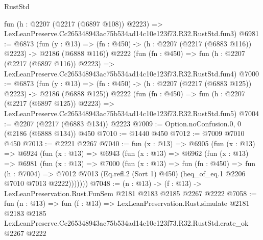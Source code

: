 \begin{lexlean}{RustStd}
\begin{coremodule}
    fun (h : @2207 (@2217 (@6897 @108)) @2223) =>
    LexLeanPreserve.Cc265348943ac75b534ad14c10e123f73.R32.RustStd.fun3)
@6981 := @6873
    (fun (y : @13) => (fn : @450) -> (h : @2207 (@2217 (@6883 @116)) @2223) -> @2186 (@6888 @116))
    @2222
    (fun (fn : @450) =>
    fun (h : @2207 (@2217 (@6897 @116)) @2223) =>
    LexLeanPreserve.Cc265348943ac75b534ad14c10e123f73.R32.RustStd.fun4)
@7000 := @6873
    (fun (y : @13) => (fn : @450) -> (h : @2207 (@2217 (@6883 @125)) @2223) -> @2186 (@6888 @125))
    @2222
    (fun (fn : @450) =>
    fun (h : @2207 (@2217 (@6897 @125)) @2223) =>
    LexLeanPreserve.Cc265348943ac75b534ad14c10e123f73.R32.RustStd.fun5)
@7004 := @2207 (@2217 (@6883 @134)) @2223
@7009 := Option.noConfusion.{0, 0} (@2186 (@6888 @134)) @450
@7010 := @1440 @450
@7012 := @7009 @7010 @450
@7013 := @2221 @2267
@7040 := fun (x : @13) =>
  @6905
    (fun (x : @13) =>
    @6924
      (fun (x : @13) =>
      @6943
        (fun (x : @13) =>
        @6962
          (fun (x : @13) =>
          @6981
            (fun (x : @13) =>
            @7000
              (fun (x : @13) =>
              fun (fn : @450) =>
              fun (h : @7004) =>
              @7012 @7013 (Eq.refl.{2} (Sort 1) @450) (heq_of_eq.{1} @2206 @7010 @7013 @2222)))))))
@7048 := (n : @13) -> (f : @13) -> LexLeanPreservation.Rust.FunSem @2181 @2183 @2185 @2267 @2222
@7058 := fun (n : @13) =>
  fun (f : @13) =>
  LexLeanPreservation.Rust.simulate
    @2181
    @2183
    @2185
    LexLeanPreserve.Cc265348943ac75b534ad14c10e123f73.R32.RustStd.crate_ok
    @2267
    @2222
\end{coremodule}
\end{lexlean}
